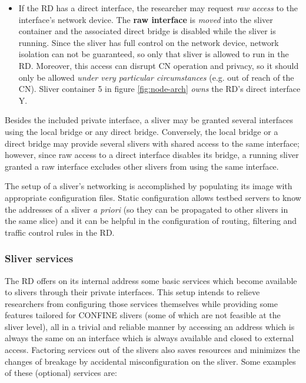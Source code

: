 \documentclass[conference]{IEEEtran}
\begin{document}
\begin{itemize}
\item If the RD has a direct interface, the researcher may request \emph{raw
  access} to the interface's network device.  The \textbf{raw interface} is
  \emph{moved} into the sliver container and the associated direct bridge is
  disabled while the sliver is running.  Since the sliver has full control on
  the network device, network isolation can not be guaranteed, so only that
  sliver is allowed to run in the RD.  Moreover, this access can disrupt CN
  operation and privacy, so it should only be allowed \emph{under very
    particular circumstances} (e.g. out of reach of the CN).  Sliver container
  5 in figure \ref{fig:node-arch} \emph{owns} the RD's direct interface Y.

\end{itemize}

Besides the included private interface, a sliver may be granted several
interfaces using the local bridge or any direct bridge.  Conversely, the local
bridge or a direct bridge may provide several slivers with shared access to
the same interface; however, since raw access to a direct interface disables
its bridge, a running sliver granted a raw interface excludes other slivers
from using the same interface.

The setup of a sliver's networking is accomplished by populating its image
with appropriate configuration files.  Static configuration allows testbed
servers to know the addresses of a sliver \emph{a priori} (so they can be
propagated to other slivers in the same slice) and it can be helpful in the
configuration of routing, filtering and traffic control rules in the RD.

\subsubsection{Sliver services}

The RD offers on its internal address some basic services which become
available to slivers through their private interfaces.  This setup intends to
relieve researchers from configuring those services themselves while providing
some features tailored for CONFINE slivers (some of which are not feasible at
the sliver level), all in a trivial and reliable manner by accessing an
address which is always the same on an interface which is always available and
closed to external access.  Factoring services out of the slivers also saves
resources and minimizes the changes of breakage by accidental misconfiguration
on the sliver.  Some examples of these (optional) services are:
\end{document}
